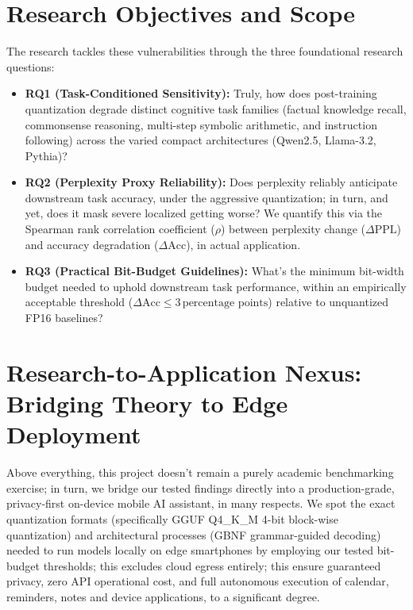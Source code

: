 \documentclass[12pt,a4paper,oneside]{report}
\begin{document}
    \section{Research Objectives and Scope}
    The research tackles these vulnerabilities through the three foundational research questions:
    \begin{itemize}[leftmargin=*]
        \item \textbf{RQ1 (Task-Conditioned Sensitivity):} Truly, how does post-training quantization degrade distinct cognitive task families (factual knowledge recall, commonsense reasoning, multi-step symbolic arithmetic, and instruction following) across the varied compact architectures (Qwen2.5, Llama-3.2, Pythia)?
        \item \textbf{RQ2 (Perplexity Proxy Reliability):} Does perplexity reliably anticipate downstream task accuracy, under the aggressive quantization; in turn, and yet, does it mask severe localized getting worse? We quantify this via the Spearman rank correlation coefficient ($\rho$) between perplexity change ($\Delta\text{PPL}$) and accuracy degradation ($\Delta\text{Acc}$), in actual application.
        \item \textbf{RQ3 (Practical Bit-Budget Guidelines):} What's the minimum bit-width budget needed to uphold downstream task performance, within an empirically acceptable threshold ($\Delta\text{Acc} \le 3\,\text{percentage points}$) relative to unquantized FP16 baselines?
    \end{itemize}

    \section{Research-to-Application Nexus: Bridging Theory to Edge Deployment}
    Above everything, this project doesn't remain a purely academic benchmarking exercise; in turn, we bridge our tested findings directly into a production-grade, privacy-first on-device mobile AI assistant, in many respects. We spot the exact quantization formats (specifically GGUF Q4\_K\_M 4-bit block-wise quantization) and architectural processes (GBNF grammar-guided decoding) needed to run models locally on edge smartphones by employing our tested bit-budget thresholds; this excludes cloud egress entirely; this ensure guaranteed privacy, zero API operational cost, and full autonomous execution of calendar, reminders, notes and device applications, to a significant degree.

\end{document}
